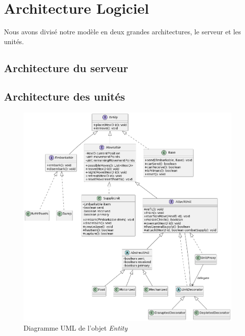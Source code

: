 

\section{Architecture Logiciel}

Nous avons divisé notre modèle en deux grandes architectures, le serveur et les unités. 

\subsection{Architecture du serveur}



\subsection{Architecture des unités}

\begin{figure}[H]
    \centering
    \includegraphics[scale=0.3]{data/uml_entityV4.png}
    \caption{Diagramme UML de l'objet \emph{Entity}}
    \label{fig:uml_entity}
\end{figure}

